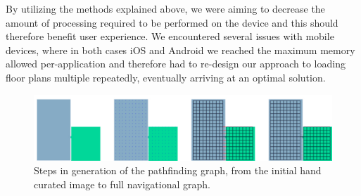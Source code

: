 \documentclass[main.tex]{subfiles}
\begin{document}
By utilizing the methods explained above, we were aiming to decrease the amount of processing required to be performed on the device and this should therefore benefit user experience. We encountered several issues with mobile devices, where in both cases iOS and Android we reached the maximum memory allowed per-application and therefore had to re-design our approach to loading floor plans multiple repeatedly, eventually arriving at an optimal solution.
\begin{figure}[h]
\center
\includegraphics[trim=0 0 0 0, clip,width=\textwidth,height=\textheight,keepaspectratio]{images/graphGeneration.pdf}
\caption{Steps in generation of the pathfinding graph, from the initial hand curated image to full navigational graph.}
\label{fig:nav_graph}
\end{figure}
\end{document}
